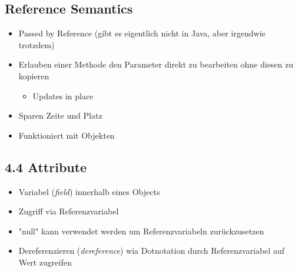\documentclass[11pt]{article}
\begin{document}
\subsection{Reference Semantics}
\label{sec:org5ff5cdb}
\begin{itemize}
\item Passed by Reference (gibt es eigentlich nicht in Java, aber irgendwie trotzdem)\\
\item Erlauben einer Methode den Parameter direkt zu bearbeiten ohne diesen zu kopieren\\
\begin{itemize}
\item Updates in place\\
\end{itemize}
\item Sparen Zeite und Platz\\
\item Funktioniert mit Objekten\\
\end{itemize}

\subsection{4.4 Attribute}
\label{sec:org6dcd374}
\begin{itemize}
\item Variabel (\emph{field}) innerhalb eines Objects\\
\item Zugriff via Referenzvariabel\\
\item "null" kann verwendet werden um Referenzvariabeln zurückzusetzen\\
\item Dereferenzieren (\emph{dereference}) wia Dotnotation durch Referenzvariabel auf Wert zugreifen\\
\end{itemize}
\end{document}
